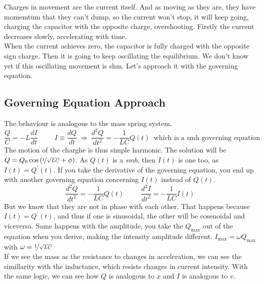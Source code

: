 \documentclass{report}
\begin{document}
        \noindent Charges in movement are the current itself. And as moving as they are, they have momemtum that they can't dump, so the current won't stop, it will keep going, charging the capacitor with the opposite charge, overshooting. Firstly the current decreases slowly, accelerating with time.\\

        \noindent When the current achieves zero, the capacitor is fully charged with the opposite sign charge. Then it is going to keep oscillating the equilibrium. We don't know yet if this oscillating movement is shm. Let's approach it with the governing equation.
          \subsection{Governing Equation Approach}
            \noindent The behaviour is analogous to the mass spring system.
            \[\dfrac{Q}{C}=-L\dfrac{dI}{dt}\hspace{1cm}I\equiv\dfrac{dQ}{dt}\ \Longrightarrow\ \dfrac{d^2Q}{dt^2}=-\dfrac{1}{LC}Q(t)\ \text{\ which is a smh governing equation} \]
            \noindent The motion of the charghe is thus simple harmonic. The solution will be $Q=Q_0\cos\left(\nicefrac{t}{\sqrt{LC}}+\phi\right)$. As $Q(t)$ is a \textit{smh}, then $I(t)$ is one too, as $I(t)=Q^\prime(t)$. If you take the derivative of the governing equation, you end up with another  governing equation concerning $I(t)$ instead of $Q(t)$. 
            \begin{equation}
              \boxed{\dfrac{d^2Q}{dt^2}=-\dfrac{1}{LC}Q(t)}\hspace{1cm}\boxed{\dfrac{d^2I}{dt^2}=-\dfrac{1}{LC}I(t)}
            \end{equation}
            \noindent But we know that they are not in phase with each other. That happens because $I(t)=Q^\prime (t)$, and thus if one is sinusoidal, the other will be cosenoidal and viceversa. Same happens with the amplitude, you take the $Q_\text{max}$ out of the equation when you derive, making the intensity amplitude different. $I_\text{max}=\omega Q_\text{max}$ with $\omega=\nicefrac{1}{\sqrt{LC}}$\\

            \noindent If we see the mass as the resistance to changes in acceleration, we can see the simillarity with the inductance, which resists changes in current intensity. With the same logic, we can see how $Q$ is analogous to $x$ and $I$ is analogous to $v$.
\end{document}
